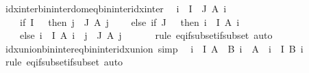\begin{isabellebody}
\ idx{\isacharunderscore}{\kern0pt}inter{\isacharunderscore}{\kern0pt}bin{\isacharunderscore}{\kern0pt}inter{\isacharunderscore}{\kern0pt}dom{\isacharunderscore}{\kern0pt}eq{\isacharunderscore}{\kern0pt}bin{\isacharunderscore}{\kern0pt}inter{\isacharunderscore}{\kern0pt}idx{\isacharunderscore}{\kern0pt}inter{\isacharcolon}{\kern0pt}\isanewline
\ \ {\isachardoublequoteopen}{\isacharparenleft}{\kern0pt}{\isasymInter}i\ {\isasymin}\ I\ {\isasymunion}\ J{\isachardot}{\kern0pt}\ A\ i{\isacharparenright}{\kern0pt}\ {\isacharequal}{\kern0pt}\ {\isacharparenleft}{\kern0pt}\isanewline
\ \ \ \ if\ I\ {\isacharequal}{\kern0pt}\ {\isacharbraceleft}{\kern0pt}{\isacharbraceright}{\kern0pt}\ then\ {\isasymInter}j\ {\isasymin}\ J{\isachardot}{\kern0pt}\ A\ j\isanewline
\ \ \ \ else\ if\ J\ {\isacharequal}{\kern0pt}\ {\isacharbraceleft}{\kern0pt}{\isacharbraceright}{\kern0pt}\ then\ {\isasymInter}i\ {\isasymin}\ I{\isachardot}{\kern0pt}\ A\ i\isanewline
\ \ \ \ else\ {\isacharparenleft}{\kern0pt}{\isasymInter}i\ {\isasymin}\ I{\isachardot}{\kern0pt}\ A\ i{\isacharparenright}{\kern0pt}\ {\isasyminter}\ {\isacharparenleft}{\kern0pt}{\isasymInter}j\ {\isasymin}\ J{\isachardot}{\kern0pt}\ A\ j{\isacharparenright}{\kern0pt}\isanewline
\ \ {\isacharparenright}{\kern0pt}{\isachardoublequoteclose}\isanewline
%
\isadelimproof
\ \ %
\endisadelimproof
%
\isatagproof
{}\isamarkupfalse%
\ {\isacharparenleft}{\kern0pt}rule\ eq{\isacharunderscore}{\kern0pt}if{\isacharunderscore}{\kern0pt}subset{\isacharunderscore}{\kern0pt}if{\isacharunderscore}{\kern0pt}subset{\isacharparenright}{\kern0pt}\ auto%
\endisatagproof
{\isafoldproof}%
%
\isadelimproof
\isanewline
%
\endisadelimproof
\isanewline
\isanewline
{}\isamarkupfalse%
\ idx{\isacharunderscore}{\kern0pt}union{\isacharunderscore}{\kern0pt}bin{\isacharunderscore}{\kern0pt}inter{\isacharunderscore}{\kern0pt}eq{\isacharunderscore}{\kern0pt}bin{\isacharunderscore}{\kern0pt}inter{\isacharunderscore}{\kern0pt}idx{\isacharunderscore}{\kern0pt}union\ {\isacharbrackleft}{\kern0pt}simp{\isacharbrackright}{\kern0pt}{\isacharcolon}{\kern0pt}\isanewline
\ \ {\isachardoublequoteopen}{\isacharparenleft}{\kern0pt}{\isasymUnion}i\ {\isasymin}\ I{\isachardot}{\kern0pt}\ A\ {\isasyminter}\ B\ i{\isacharparenright}{\kern0pt}\ {\isacharequal}{\kern0pt}\ A\ {\isasyminter}\ {\isacharparenleft}{\kern0pt}{\isasymUnion}i\ {\isasymin}\ I{\isachardot}{\kern0pt}\ B\ i{\isacharparenright}{\kern0pt}{\isachardoublequoteclose}\isanewline
%
\isadelimproof
\ \ %
\endisadelimproof
%
\isatagproof
{}\isamarkupfalse%
\ {\isacharparenleft}{\kern0pt}rule\ eq{\isacharunderscore}{\kern0pt}if{\isacharunderscore}{\kern0pt}subset{\isacharunderscore}{\kern0pt}if{\isacharunderscore}{\kern0pt}subset{\isacharparenright}{\kern0pt}\ auto%

\end{isabellebody}
